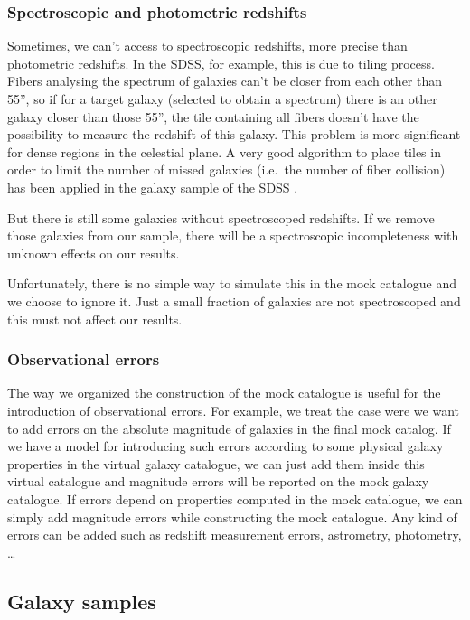 \subsubsection{Spectroscopic and photometric redshifts}

Sometimes, we can't access to spectroscopic redshifts, more precise than
photometric redshifts. In the SDSS, for example, this is due to tiling process.
Fibers analysing the spectrum of galaxies can't be closer from each other than
55'', so if for a target galaxy (selected to obtain a spectrum) there is an
other galaxy closer than those 55'', the tile containing all fibers doesn't
have the possibility to measure the redshift of this galaxy. This problem is
more significant for dense regions in the celestial plane. A very good
algorithm to place tiles in order to limit the number of missed galaxies (i.e.\
the number of fiber collision) has been applied in the galaxy sample of the
SDSS \citep{Blanton+03}.

But there is still some galaxies without spectroscoped redshifts. If we remove
those galaxies from our sample, there will be a spectroscopic incompleteness
with unknown effects on our results.

Unfortunately, there is no simple way to simulate this in the mock catalogue
and we choose to ignore it. Just a small fraction of galaxies are not
spectroscoped and this must not affect our results.

\subsubsection{Observational errors}

The way we organized the construction of the mock catalogue is useful for the
introduction of observational errors. For example, we treat the case were we
want to add errors on the absolute magnitude of galaxies in the final mock
catalog. If we have a model for introducing such errors according to some
physical galaxy properties in the virtual galaxy catalogue, we can just add them
inside this virtual catalogue and magnitude errors will be reported on the mock galaxy
catalogue. If errors depend on properties computed in the mock catalogue, we
can simply add magnitude errors while constructing the mock catalogue. Any
kind of errors can be added such as redshift measurement errors, astrometry,
photometry, \dots

\subsection{Galaxy samples}
\label{sub:galaxy_samples}


